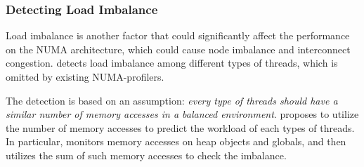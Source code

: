 
\subsubsection{Detecting Load Imbalance}
Load imbalance is another factor that could significantly affect the performance on the NUMA architecture, which could cause node imbalance and interconnect congestion. \NP{} detects load imbalance among different types of threads, which is omitted by existing NUMA-profilers.  %



The detection is based on an assumption: \textit{every type of threads should have a similar number of memory accesses in a balanced environment}. \NP{} proposes to utilize the number of memory accesses to predict the workload of each types of threads. In particular, \NP{} monitors memory accesses on heap objects and globals, and then utilizes the sum of such memory accesses to check the imbalance. 


